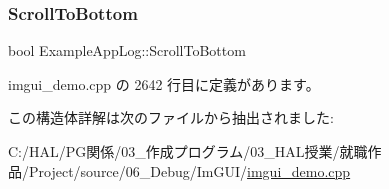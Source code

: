 \mbox{\label{struct_example_app_log_a6834b71563c0595e67b78afb6c7ce39d}} 
\subsubsection{\texorpdfstring{Scroll\+To\+Bottom}{ScrollToBottom}}
{\footnotesize\ttfamily bool Example\+App\+Log\+::\+Scroll\+To\+Bottom}



 imgui\+\_\+demo.\+cpp の 2642 行目に定義があります。



この構造体詳解は次のファイルから抽出されました\+:\begin{DoxyCompactItemize}
\item 
C\+:/\+H\+A\+L/\+P\+G関係/03\+\_\+作成プログラム/03\+\_\+\+H\+A\+L授業/就職作品/\+Project/source/06\+\_\+\+Debug/\+Im\+G\+U\+I/\mbox{\hyperlink{imgui__demo_8cpp}{imgui\+\_\+demo.\+cpp}}\end{DoxyCompactItemize}
